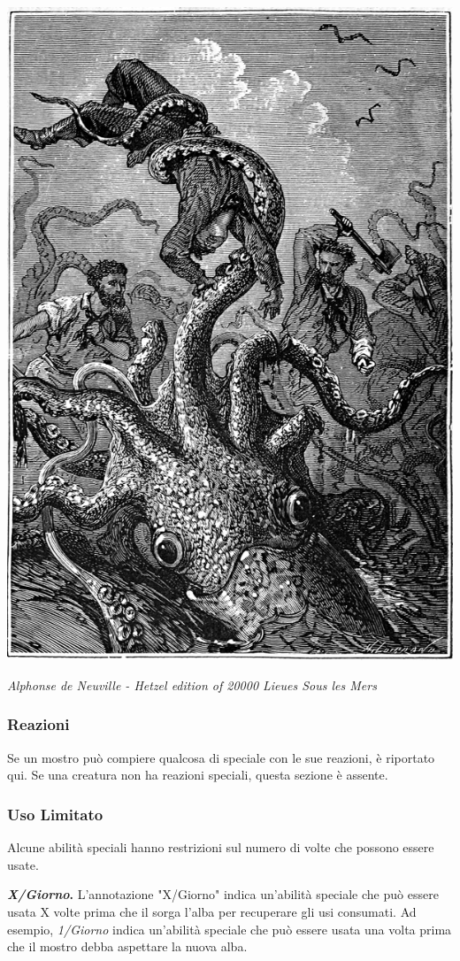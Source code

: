 \begin{multicols}{2}
\begin{center}
	\includegraphics[width=0.65\linewidth]{immagini/polpo.png}

	\emph{Alphonse de Neuville - Hetzel edition of 20000 Lieues Sous les Mers}
\end{center}

\subsubsection{Reazioni}

Se un mostro può compiere qualcosa di speciale con le sue reazioni, è riportato qui. Se una creatura non ha reazioni speciali, questa sezione è assente.

\subsubsection{Uso Limitato}

Alcune abilità speciali hanno restrizioni sul numero di volte che possono essere usate.

\textbf{\emph{X/Giorno}.} L'annotazione "X/Giorno" indica un'abilità speciale che può essere usata X volte prima che il sorga l'alba per recuperare gli usi consumati. Ad esempio, \emph{1/Giorno} indica un'abilità speciale che può essere usata una volta prima che il mostro debba aspettare la nuova alba.


\end{multicols}
